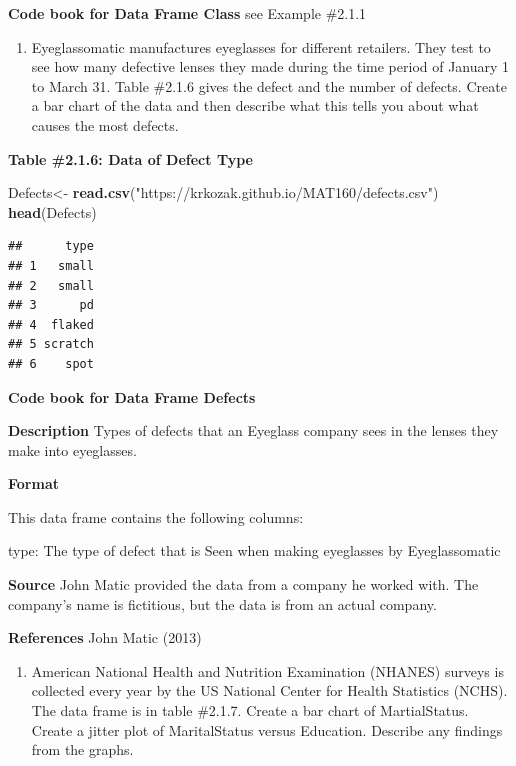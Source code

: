 \documentclass[
]{book}
\newenvironment{Shaded}{\begin{snugshade}}{\end{snugshade}}
\newcommand{\KeywordTok}[1]{\textcolor[rgb]{0.13,0.29,0.53}{\textbf{#1}}}
\newcommand{\NormalTok}[1]{#1}
\newcommand{\StringTok}[1]{\textcolor[rgb]{0.31,0.60,0.02}{#1}}
\providecommand{\tightlist}{%
  \setlength{\itemsep}{0pt}\setlength{\parskip}{0pt}}
\begin{document}
\textbf{Code book for Data Frame Class} see Example \#2.1.1

\begin{enumerate}
\def\labelenumi{\arabic{enumi}.}
\setcounter{enumi}{4}
\tightlist
\item
  Eyeglassomatic manufactures eyeglasses for different retailers. They test to see how many defective lenses they made during the time period of January 1 to March 31. Table \#2.1.6 gives the defect and the number of defects. Create a bar chart of the data and then describe what this tells you about what causes the most defects.
\end{enumerate}

\textbf{Table \#2.1.6: Data of Defect Type}

\begin{Shaded}
\begin{Highlighting}[]
\NormalTok{Defects<-}\StringTok{ }\KeywordTok{read.csv}\NormalTok{(}\StringTok{"https://krkozak.github.io/MAT160/defects.csv"}\NormalTok{) }
\KeywordTok{head}\NormalTok{(Defects)}
\end{Highlighting}
\end{Shaded}

\begin{verbatim}
##      type
## 1   small
## 2   small
## 3      pd
## 4  flaked
## 5 scratch
## 6    spot
\end{verbatim}

\textbf{Code book for Data Frame Defects}

\textbf{Description}
Types of defects that an Eyeglass company sees in the lenses they make into eyeglasses.

\textbf{Format}

This data frame contains the following columns:

type: The type of defect that is Seen when making eyeglasses by Eyeglassomatic

\textbf{Source}
John Matic provided the data from a company he worked with. The company's name is fictitious, but the data is from an actual company.

\textbf{References}
John Matic (2013)

\begin{enumerate}
\def\labelenumi{\arabic{enumi}.}
\setcounter{enumi}{5}
\tightlist
\item
  American National Health and Nutrition Examination (NHANES) surveys is collected every year by the US National Center for Health Statistics (NCHS). The data frame is in table \#2.1.7. Create a bar chart of MartialStatus. Create a jitter plot of MaritalStatus versus Education. Describe any findings from the graphs.
\end{enumerate}
\end{document}
